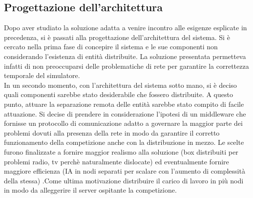 \subsection{Progettazione dell'architettura}
Dopo aver studiato la soluzione adatta a venire incontro alle esigenze esplicate in precedenza, si è passati alla progettazione dell’architettura del sistema. Si è cercato nella prima fase di concepire il sistema e le sue componenti non considerando l’esistenza di entità distribuite. La soluzione presentata permetteva infatti di non preoccuparsi delle problematiche di rete per garantire la correttezza temporale del simulatore.\\
In un secondo momento, con l’architettura del sistema sotto mano, si è deciso quali componenti sarebbe stato desiderabile che fossero distribuite. A questo punto, attuare la separazione remota delle entità sarebbe stato compito di facile attuazione. Si decise di prendere in considerazione l’ipotesi di un middleware che fornisse un protocollo di comunicazione adatto a governare la maggior parte dei problemi dovuti alla presenza della rete in modo da garantire il corretto funzionamento della competizione anche con la distribuzione in mezzo.
Le scelte furono finalizzate a fornire maggior realismo alla soluzione (box distribuiti per problemi radio, tv perchè naturalmente dislocate) ed eventualmente fornire maggiore efficienza (IA in nodi separati per scalare con l'aumento di complessità della stessa) .Come ultima motivazione distribuire il carico di lavoro in più nodi in modo da alleggerire il server ospitante la competizione.
